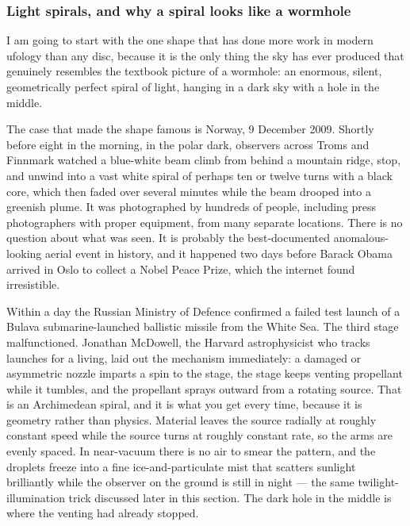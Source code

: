 \subsubsection*{Light spirals, and why a spiral looks like a wormhole}

I am going to start with the one shape that has done more work in modern ufology than any disc,
because it is the only thing the sky has ever produced that genuinely resembles the textbook
picture of a wormhole: an enormous, silent, geometrically perfect spiral of light, hanging in a
dark sky with a hole in the middle.

The case that made the shape famous is Norway, 9 December 2009. Shortly before eight in the
morning, in the polar dark, observers across Troms and Finnmark watched a blue-white beam climb
from behind a mountain ridge, stop, and unwind into a vast white spiral of perhaps ten or twelve
turns with a black core, which then faded over several minutes while the beam drooped into a
greenish plume. It was photographed by hundreds of people, including press photographers with
proper equipment, from many separate locations. There is no question about what was seen. It is
probably the best-documented anomalous-looking aerial event in history, and it happened two days
before Barack Obama arrived in Oslo to collect a Nobel Peace Prize, which the internet found
irresistible.

Within a day the Russian Ministry of Defence confirmed a failed test launch of a Bulava
submarine-launched ballistic missile from the White Sea. The third stage malfunctioned. Jonathan
McDowell, the Harvard astrophysicist who tracks launches for a living, laid out the mechanism
immediately: a damaged or asymmetric nozzle imparts a spin to the stage, the stage keeps venting
propellant while it tumbles, and the propellant sprays outward from a rotating source. That is
an Archimedean spiral, and it is what you get every time, because it is geometry rather than
physics. Material leaves the source radially at roughly constant speed while the source turns at
roughly constant rate, so the arms are evenly spaced. In near-vacuum there is no air to smear the
pattern, and the droplets freeze into a fine ice-and-particulate mist that scatters sunlight
brilliantly while the observer on the ground is still in night --- the same twilight-illumination
trick discussed later in this section. The dark hole in the middle is where the venting had
already stopped.

